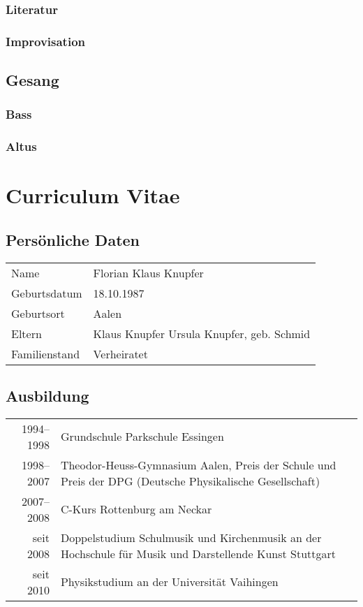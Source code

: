 \documentclass[11pt]{article}
\begin{document}
\subsubsection{Literatur}
\label{sec-2-1-1}
\subsubsection{Improvisation}
\label{sec-2-1-2}

\subsection{Gesang}
\label{sec-2-2}
\subsubsection{Bass}
\label{sec-2-2-1}
\subsubsection{Altus}
\label{sec-2-2-2}

\section{Curriculum Vitae}
\label{sec-3}
\subsection{Persönliche Daten}
\label{sec-3-1}
\begin{center}
\begin{tabular}{ll}
\hline
Name & Florian Klaus Knupfer\\
Geburtsdatum & 18.10.1987\\
Geburtsort & Aalen\\
Eltern & Klaus Knupfer Ursula Knupfer, geb. Schmid\\
Familienstand & Verheiratet\\
\hline
\end{tabular}
\end{center}
\subsection{Ausbildung}
\label{sec-3-2}
\begin{center}
\begin{tabular}{rl}
\hline
1994–1998 & Grundschule Parkschule Essingen\\
1998–2007 & Theodor-Heuss-Gymnasium Aalen, Preis der Schule und Preis der DPG (Deutsche Physikalische Gesellschaft)\\
2007–2008 & C-Kurs Rottenburg am Neckar\\
seit 2008 & Doppelstudium Schulmusik und Kirchenmusik an der Hochschule für Musik und Darstellende Kunst Stuttgart\\
seit 2010 & Physikstudium an der Universität Vaihingen\\
\hline
\end{tabular}
\end{center}
\end{document}
